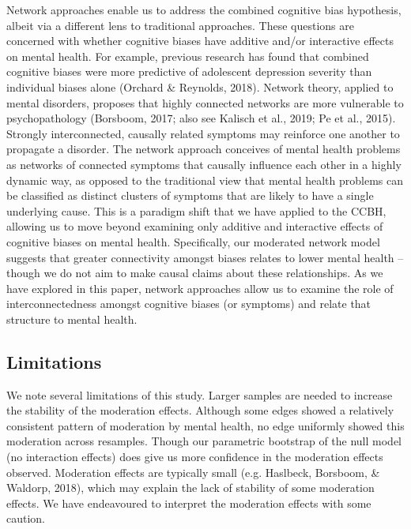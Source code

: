 \documentclass[
  english,
  man]{apa6}
\begin{document}
Network approaches enable us to address the combined cognitive bias hypothesis, albeit via a different lens to traditional approaches. These questions are concerned with whether cognitive biases have additive and/or interactive effects on mental health. For example, previous research has found that combined cognitive biases were more predictive of adolescent depression severity than individual biases alone (Orchard \& Reynolds, 2018). Network theory, applied to mental disorders, proposes that highly connected networks are more vulnerable to psychopathology (Borsboom, 2017; also see Kalisch et al., 2019; Pe et al., 2015). Strongly interconnected, causally related symptoms may reinforce one another to propagate a disorder. The network approach conceives of mental health problems as networks of connected symptoms that causally influence each other in a highly dynamic way, as opposed to the traditional view that mental health problems can be classified as distinct clusters of symptoms that are likely to have a single underlying cause. This is a paradigm shift that we have applied to the CCBH, allowing us to move beyond examining only additive and interactive effects of cognitive biases on mental health. Specifically, our moderated network model suggests that greater connectivity amongst biases relates to lower mental health -- though we do not aim to make causal claims about these relationships. As we have explored in this paper, network approaches allow us to examine the role of interconnectedness amongst cognitive biases (or symptoms) and relate that structure to mental health.

\hypertarget{limitations}{%
\subsection{Limitations}\label{limitations}}

We note several limitations of this study. Larger samples are needed to increase the stability of the moderation effects. Although some edges showed a relatively consistent pattern of moderation by mental health, no edge uniformly showed this moderation across resamples. Though our parametric bootstrap of the null model (no interaction effects) does give us more confidence in the moderation effects observed. Moderation effects are typically small (e.g. Haslbeck, Borsboom, \& Waldorp, 2018), which may explain the lack of stability of some moderation effects. We have endeavoured to interpret the moderation effects with some caution.
\end{document}
